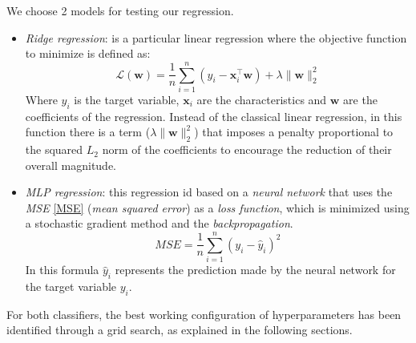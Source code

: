 We choose 2 models for testing our regression. 
\begin{itemize}
    \item \textit{Ridge regression}\cite{Ridge}: is a particular linear regression where the objective function to minimize is defined as: 
    \begin{equation}
        \mathcal{L}(\mathbf{w})=\frac{1}{n}\sum_{i=1}^n\left(y_i - \mathbf{x}_i^\top\mathbf{w} \right) + \lambda\| \mathbf{w}\|_2^2
    \end{equation}
    Where \(y_i\) is the target variable, \(\mathbf{x}_i\) are the characteristics and \(\mathbf{w}\) are the coefficients of the regression. Instead of the classical linear regression, in this function there is a term (\(\lambda\|\mathbf{w}\|_2^2\)) that imposes a penalty proportional to the squared \(L_2\)
    norm of the coefficients to encourage the reduction of their overall magnitude.
    \item \textit{MLP regression}\cite{MLP}: this regression id based on a \textit{neural network} that uses the \textit{MSE} \eqref{MSE} (\textit{mean squared error}) as a \textit{loss function}, which is minimized using a stochastic gradient method and the \textit{backpropagation}.
    \begin{equation} \label{MSE}
        MSE = \frac{1}{n}\sum_{i=1}^n\left(y_i-\hat{y}_i\right)^2
    \end{equation}
    In this formula \(\hat{y}_i\) represents the prediction made by the neural network for the target variable \(y_i\).
\end{itemize}
For both classifiers, the best working configuration of hyperparameters has been identified through a grid search, as explained in the following sections.
